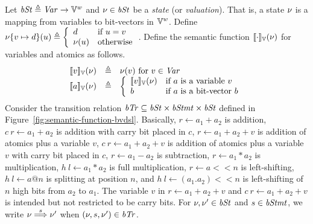 Let $\mathit{bSt} \triangleq \mathit{Var} \rightarrow \mathbb{V}^w$ and $\nu \in \mathit{bSt}$ be a \emph{state} (or \emph{valuation}).
That is, a {state} $\nu$ is a mapping from variables to bit-vectors in $\mathbb{V}^w$.
Define
$
\nu\{{v} \mapsto {d}\}(u) \triangleq
\left\{
   \begin{array}{ll}
     d & \textmd{if $u = v$}\\
     \nu(u) & \textmd{otherwise}
   \end{array}
\right.
$.
Define the semantic function $[\![{\cdot}]\!]_{\mathbb{V}}(\nu)$ for variables and atomics as follows.
\[
\begin{array}{rcl}
\bvvalueof{v}(\bvst) & \defn & \bvst(v) \textmd{  for ${v} \in \Var$} \\
\bvvalueof{a}(\bvst) & \defn & \left\{
  \begin{array}{ll}
  \bvvalueof{v}(\bvst) & \textmd{if $a$ is a variable $v$} \\
  b & \textmd{if $a$ is a bit-vector $b$} \\
  \end{array}
  \right. \\
\end{array}
\]
Consider the transition relation $\mathit{bTr} \subseteq \mathit{bSt} \times \mathit{bStmt} \times \mathit{bSt}$ defined in Figure~\ref{fig:semantic-function-bvdsl}.
Basically, $r \leftarrow a_1 + a_2$ is addition, $c\ r \leftarrow a_1 + a_2$ is addition with carry bit placed in $c$, $r \leftarrow a_1 + a_2 + v$ is addition of atomics plus a variable $v$, $c\ r \leftarrow a_1 + a_2 + v$ is addition of atomics plus a variable $v$ with carry bit placed in $c$, $r \leftarrow a_1 - a_2$ is subtraction, $r \leftarrow a_1 * a_2$ is multiplication, $h\ l \leftarrow a_1 * a_2$ is full multiplication, $r \leftarrow a << n$ is left-shifting, $h\ l \leftarrow a @ n$ is splitting at position $n$, and $h\ l \leftarrow (a_1 . a_2) << n$ is left-shifting of $n$ high bits from $a_2$ to $a_1$.
The variable $v$ in $r \leftarrow a_1 + a_2 + v$ and $c\ r \leftarrow a_1 + a_2 + v$ is intended but not restricted to be carry bits.
For $\nu, \nu' \in \mathit{bSt}$ and $s \in \mathit{bStmt}$, we write $\nu \overset{s}{\Longrightarrow} \nu'$ when $(\nu, s, \nu') \in \mathit{bTr}$.


